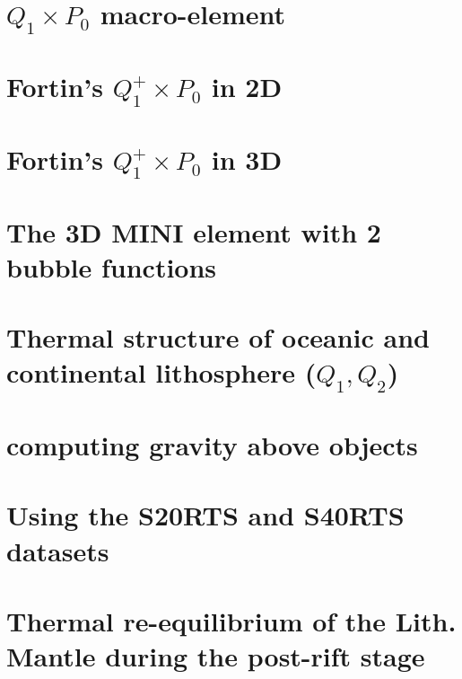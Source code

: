 \documentclass[a4paper,11pt]{report}
\begin{document}
\chapter{$Q_1\times P_0$ macro-element \label{f78}}

\chapter{Fortin's $Q_1^+\times P_0$ in 2D \label{f80}}

\chapter{Fortin's $Q_1^+\times P_0$ in 3D \label{f81}}

\chapter{The 3D MINI element with 2 bubble functions \label{f82}}

\chapter{Thermal structure of oceanic and continental lithosphere ($Q_1,Q_2$)\label{f83}}

\chapter{computing gravity above objects \label{f84}}

\chapter{Using the S20RTS and S40RTS datasets \label{f85}}

\chapter{Thermal re-equilibrium of the Lith. Mantle during the post-rift stage \label{f86}}
\end{document}
